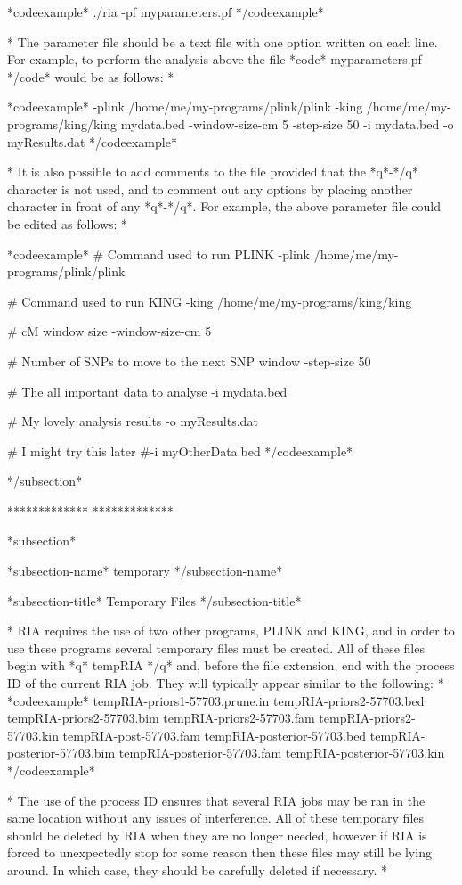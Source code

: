*codeexample*
./ria -pf myparameters.pf
*/codeexample*

* The parameter file should be a text file with one option written on each line. For example, to perform the analysis above the file *code* myparameters.pf */code* would be as follows: *

*codeexample*
-plink /home/me/my-programs/plink/plink
-king /home/me/my-programs/king/king mydata.bed
-window-size-cm 5
-step-size 50
-i mydata.bed
-o myResults.dat
*/codeexample*

* It is also possible to add comments to the file provided that the *q*-*/q* character is not used, and to comment out any options by placing another character in front of any *q*-*/q*. For example, the above parameter file could be edited as follows: *


*codeexample*
# Command used to run PLINK
-plink /home/me/my-programs/plink/plink

# Command used to run KING
-king /home/me/my-programs/king/king

# cM window size
-window-size-cm 5

# Number of SNPs to move to the next SNP window
-step-size 50

# The all important data to analyse
-i mydata.bed

# My lovely analysis results
-o myResults.dat

# I might try this later
#-i myOtherData.bed
*/codeexample*

*/subsection*

*************
*************

*subsection*

*subsection-name* temporary */subsection-name*

*subsection-title* Temporary Files */subsection-title*


*
RIA requires the use of two other programs, PLINK and KING, and in order to use these programs several temporary files must be created. All of these files begin with *q* tempRIA */q* and, before the file extension, end with the process ID of the current RIA job. They will typically appear similar to the following:
*
*codeexample*
tempRIA-priors1-57703.prune.in
tempRIA-priors2-57703.bed
tempRIA-priors2-57703.bim
tempRIA-priors2-57703.fam
tempRIA-priors2-57703.kin
tempRIA-post-57703.fam
tempRIA-posterior-57703.bed
tempRIA-posterior-57703.bim
tempRIA-posterior-57703.fam
tempRIA-posterior-57703.kin
*/codeexample*

*
The use of the process ID ensures that several RIA jobs may be ran in the same location without any issues of interference. All of these temporary files should be deleted by RIA when they are no longer needed, however if RIA is forced to unexpectedly stop for some reason then these files may still be lying around. In which case, they should be carefully deleted if necessary.
*

